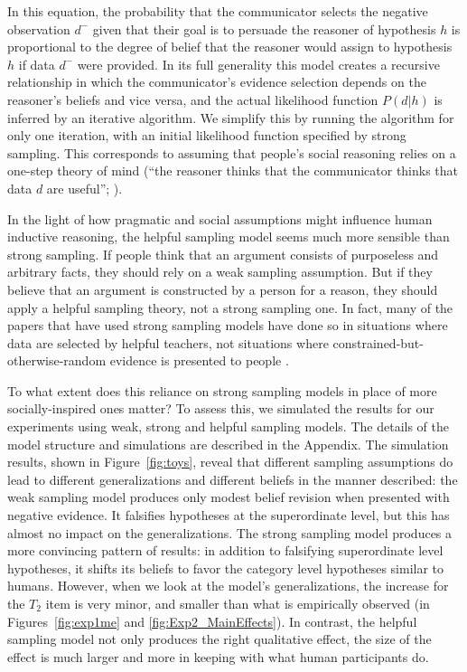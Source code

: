 \documentclass[authoryear,11pt]{elsarticle}
\begin{document}
\noindent In this equation, the probability that the communicator selects the negative observation $d^-$ given that their goal is to persuade the reasoner of hypothesis $h$ is proportional to the degree of belief that the reasoner would assign to hypothesis $h$ if data $d^-$ were provided. In its full generality this model creates a recursive relationship in which the communicator's evidence selection depends on the reasoner's beliefs and vice versa, and the actual likelihood function $P(d|h)$ is inferred by an iterative algorithm. We simplify this by running the algorithm for only one iteration, with an initial likelihood function specified by strong sampling. This corresponds to assuming that people's social reasoning relies on a one-step theory of mind (``the reasoner thinks that the communicator thinks that data $d$ are useful''; \citealp[see][]{GoodmanStuhlmuller2013, TesslerGoodman2014}).

In the light of how pragmatic and social assumptions might influence human inductive reasoning, the helpful sampling model seems much more sensible than strong sampling. If people think that an argument consists of purposeless and arbitrary facts, they should rely on a weak sampling assumption. But if they believe that an argument is constructed by a person for a reason, they should apply a helpful sampling theory, not a strong sampling one. In fact, many of the papers that have used strong sampling models have done so in situations where data are selected by helpful teachers, not situations where constrained-but-otherwise-random evidence is presented to people \citep[e.g.][]{xu_sensitivity_2007,gweon_infants_2010,Ransometalsubmitted}.

To what extent does this reliance on strong sampling models in place of more socially-inspired ones matter? To assess this, we simulated the results for our experiments using weak, strong and helpful sampling models. The details of the model structure and simulations are described in the Appendix. The simulation results, shown in Figure~\ref{fig:toys}, reveal that different sampling assumptions do lead to different generalizations and different beliefs in the manner described: the weak sampling model produces only modest belief revision when presented with negative evidence. It falsifies hypotheses at the {\sc superordinate} level, but this has almost no impact on the generalizations. The strong sampling model produces a more convincing pattern of results: in addition to falsifying {\sc superordinate} level hypotheses, it shifts its beliefs to favor the {\sc category} level hypotheses similar to humans. However, when we look at the model's generalizations, the increase for the $T_2$ item is very minor, and smaller than what is empirically observed (in Figures~\ref{fig:exp1me} and \ref{fig:Exp2_MainEffects}). In contrast, the helpful sampling model not only produces the right qualitative effect, the size of the effect is much larger and more in keeping with what human participants do.
\end{document}
